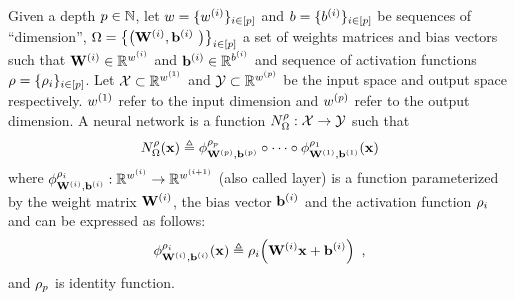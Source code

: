 \begin{definition}
  Given a depth $p \in \mathbb{N}$, 
  let $w = \{ w^{(i)} \}_{i \in [p]}$ and $b = \{ b^{(i)} \}_{i \in [p]}$ be sequences of ``dimension'', $\weights = \left\{ \left( \Wmat^{(i)}, \bvec^{(i)} \right) \right\}_{i \in [\depth]}$ a set of weights matrices and bias vectors 
  such that $\mathbf{W}^{(i)} \in \mathbb{R}^{w^{(i)}}$ and $\mathbf{b}^{(i)} \in \mathbb{R}^{b^{(i)}}$ and sequence of activation functions $\rho = \{\rho_i \}_{i \in [p]}$.
  Let $\mathcal{X} \subset \mathbb{R}^{w^{(1)}}$ and $\mathcal{Y} \subset \mathbb{R}^{w^{(p)}}$ be the input space and output space respectively. 
  $w^{(1)}$ refer to the input dimension and $w^{(p)}$ refer to the output dimension.
  A neural network is a function $N^\rho_\Omega : \mathcal{X} \rightarrow \mathcal{Y}$ such that
  \begin{equation}
    N^\rho_{\Omega}(\mathbf{x}) \triangleq \phi^{\rho_p}_{\mathbf{W}^{(p)}, \mathbf{b}^{(p)}} \circ \cdots \circ \phi^{\rho_1}_{\mathbf{W}^{(1)}, \mathbf{b}^{(1)}}(\mathbf{x})
  \end{equation}
  where $\phi^{\rho_i}_{\mathbf{W}^{(i)},\mathbf{b}^{(i)}}: \mathbb{R}^{w^{(i)}} \rightarrow \mathbb{R}^{w^{(i+1)}}$ (also called layer) is a function parameterized by the weight matrix $\mathbf{W}^{(i)}$, the bias vector $\mathbf{b}^{(i)}$ and the activation function $\rho_i$ and can be expressed as follows: 
  \begin{equation}
    \phi^{\act_i}_{\Wmat^{(i)},\bvec^{(i)}} (\xvec) \triangleq \act_i \left(\Wmat^{(i)}\xvec + \bvec^{(i)}\right) \enspace,
  \end{equation}
  and $\rho_p$ is identity function.
\end{definition}

